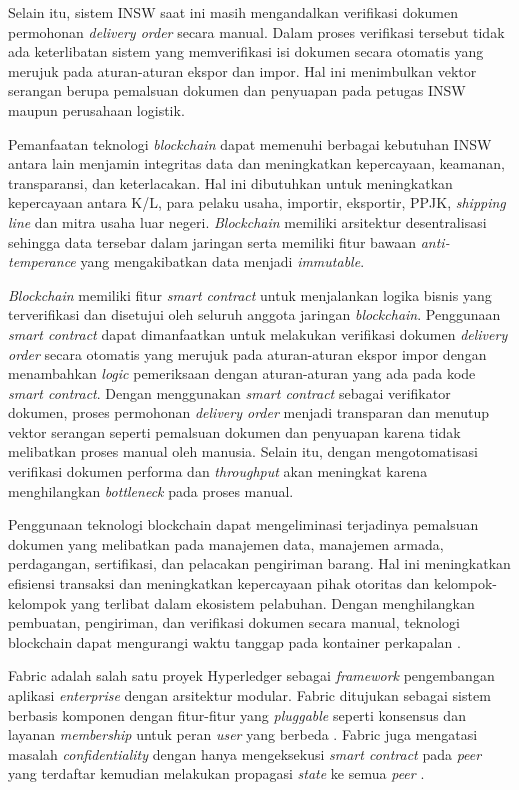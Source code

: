 Selain itu, sistem INSW saat ini masih mengandalkan verifikasi dokumen permohonan \textit{delivery order} secara manual. Dalam proses verifikasi tersebut tidak ada keterlibatan sistem yang memverifikasi isi dokumen secara otomatis yang merujuk pada aturan-aturan ekspor dan impor. Hal ini menimbulkan vektor serangan berupa pemalsuan dokumen dan penyuapan pada petugas INSW maupun perusahaan logistik. 

Pemanfaatan teknologi \textit{blockchain} dapat memenuhi berbagai kebutuhan INSW antara lain menjamin integritas data dan meningkatkan kepercayaan, keamanan, transparansi, dan keterlacakan. Hal ini dibutuhkan untuk meningkatkan kepercayaan antara K/L, para pelaku usaha, importir, eksportir, PPJK, \textit{shipping line} dan mitra usaha luar negeri. \textit{Blockchain} memiliki arsitektur desentralisasi sehingga data tersebar dalam jaringan serta memiliki fitur bawaan \textit{anti-temperance} yang mengakibatkan data menjadi \textit{immutable}. 

\textit{Blockchain} memiliki fitur \textit{smart contract} untuk menjalankan logika bisnis yang terverifikasi dan disetujui oleh seluruh anggota jaringan \textit{blockchain}. Penggunaan \textit{smart contract} dapat dimanfaatkan untuk melakukan verifikasi dokumen \textit{delivery order} secara otomatis yang merujuk pada aturan-aturan ekspor impor dengan menambahkan \textit{logic} pemeriksaan dengan aturan-aturan yang ada pada kode \textit{smart contract}. Dengan menggunakan \textit{smart contract} sebagai verifikator dokumen, proses permohonan \textit{delivery order} menjadi transparan dan menutup vektor serangan seperti pemalsuan dokumen dan penyuapan karena tidak melibatkan proses manual oleh manusia. Selain itu, dengan mengotomatisasi verifikasi dokumen performa dan \textit{throughput} akan meningkat karena menghilangkan \textit{bottleneck} pada proses manual.

Penggunaan teknologi blockchain dapat mengeliminasi terjadinya pemalsuan dokumen yang melibatkan pada manajemen data, manajemen armada, perdagangan, sertifikasi, dan pelacakan pengiriman barang. Hal ini meningkatkan efisiensi transaksi dan meningkatkan kepercayaan pihak otoritas dan kelompok-kelompok yang terlibat dalam ekosistem pelabuhan. Dengan menghilangkan pembuatan, pengiriman, dan verifikasi dokumen secara manual, teknologi blockchain dapat mengurangi waktu tanggap pada kontainer perkapalan \citep{Ahmad2021}.

Fabric adalah salah satu proyek Hyperledger sebagai \textit{framework} pengembangan aplikasi \textit{enterprise} dengan arsitektur modular. Fabric ditujukan sebagai sistem berbasis komponen dengan fitur-fitur yang \textit{pluggable} seperti konsensus dan layanan \textit{membership} untuk peran \textit{user} yang berbeda \cite{Dhillon2017}. Fabric juga mengatasi masalah \textit{confidentiality} dengan hanya mengeksekusi \textit{smart contract} pada \textit{peer} yang terdaftar kemudian melakukan propagasi \textit{state} ke semua \textit{peer} \cite{Androulaki2018}. 

